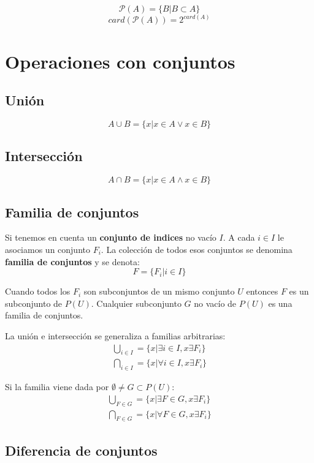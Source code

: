 \[
\mathcal{P}(A) = \{ B | B \subset A \}
\]
\[
card(\mathcal{P}(A))=2^{card(A)}
\]

\section{Operaciones con conjuntos}

\subsection{Unión}

\[
A \cup B = \{x | x \in A \vee x \in B\}
\]

\subsection{Intersección}

\[
A \cap B = \{x | x \in A \wedge x \in B\}
\]

\subsection{Familia de conjuntos}

Si tenemos en cuenta un \textbf{conjunto de indices} no vacío $I$. A cada $i \in I$ le asociamos un conjunto $F_i$. La colección de todos esos conjuntos se denomina \textbf{familia de conjuntos} y se denota:
\[
F = \{F_i | i \in I\}
\]

Cuando todos los $F_i$ son subconjuntos de un mismo conjunto $U$ entonces $F$ es un subconjunto de $P(U)$. Cualquier subconjunto $G$ no vacío de $P(U)$ es una familia de conjuntos.

La unión e intersección se generaliza a familias arbitrarias:
\begin{align*}
\bigcup_{i \in I} = \{x | \exists i \in I, x \exists F_i \} \\
\bigcap_{i \in I} = \{x | \forall i \in I, x \exists F_i \}
\end{align*}

Si la familia viene dada por $\emptyset  \neq G \subset P(U)$:
\begin{align*}
\bigcup_{F \in G} = \{x | \exists F \in G, x \exists F_i \} \\
\bigcap_{F \in G} = \{x | \forall F \in G, x \exists F_i \}
\end{align*}

\subsection{Diferencia de conjuntos}


